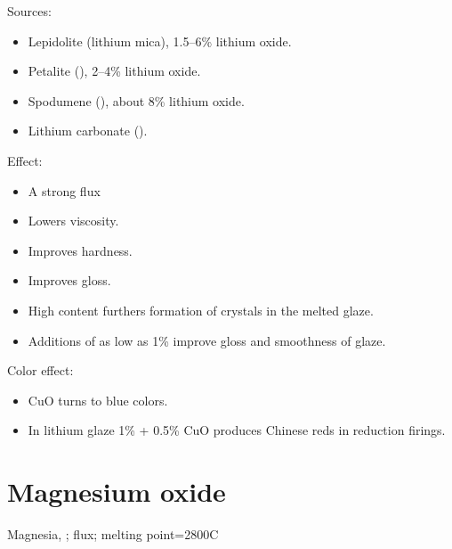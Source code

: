 Sources:
\begin{itemize}
  \item Lepidolite (lithium mica), 1.5--6\% lithium oxide.
  \item Petalite (), 2--4\% lithium oxide.
  \item Spodumene (), about 8\% lithium oxide.
  \item Lithium carbonate ().
\end{itemize}
Effect:
\begin{itemize}
  \item A strong flux
  \item Lowers viscosity.
  \item Improves hardness.
  \item Improves gloss.
  \item High  content furthers formation of crystals in the melted 
  glaze.
  \item Additions of  as low as 1\% improve gloss and smoothness of 
  glaze.
\end{itemize}
Color effect:
\begin{itemize}
  \item CuO turns to blue colors.
  \item In lithium glaze 1\%  + 0.5\% CuO produces Chinese reds in 
  reduction firings.
\end{itemize}
\section{Magnesium oxide}
Magnesia, ; flux; melting point=2800\degree C

